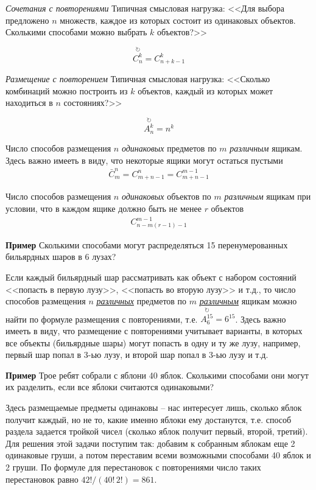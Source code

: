 \documentclass[%
	11pt,
	a4paper,
	utf8,
		]{article}
\begin{document}
\emph{Сочетания с повторениями} Типичная смысловая нагрузка: <<Для выбора предложено $ n $ множеств, каждое из которых состоит из одинаковых объектов. Сколькими способами можно выбрать $ k $ объектов?>>

$$ \stackrel{\circlearrowright}{C_n^k} = C_{n + k - 1}^k $$

\emph{Размещение с повторением} Типичная смысловая нагрузка: <<Сколько комбинаций можно построить из $ k $ объектов, каждый из которых может находиться в $ n $ состояниях?>>

$$ \stackrel{\circlearrowright}{A_n^k} = n^k $$

Число способов размещения $ n $ \emph{одинаковых} предметов по $ m $ \emph{различным} ящикам. Здесь важно имееть в виду, что некоторые ящики могут остаться пустыми
\begin{align*}
	\bar{C}_m^n = C_{m+n-1}^n = C_{m+n-1}^{m-1}
\end{align*}

Число способов размещения $ n $ \emph{одинаковых} объектов по $ m $ \emph{различным} ящикам при условии, что в каждом ящике должно быть не менее $ r $ объектов
\begin{align*}
	C^{m-1}_{n - m(r-1) -1}
\end{align*}

\textbf{Пример} \cite[]{vilenkin:comb-2022} Сколькими способами могут распределяться 15 перенумерованных бильярдных шаров в 6 лузах?

Если каждый бильярдный шар рассматривать как объект с набором состояний <<попасть в первую лузу>>, <<попасть во вторую лузу>> и т.д., то число способов размещения $ n $ \emph{\underline{различных}} предметов по $ m $ \emph{\underline{различным}} ящикам можно найти по формуле размещения с повторениями, т.е. $ \stackrel{\circlearrowright}{A_{6}^{15}} = 6^{15} $. Здесь важно имееть в виду, что размещение с повторениями учитывает варианты, в которых все объекты (бильярдные шары) могут попасть в одну и ту же лузу, например, первый шар попал в 3-ью лузу, и второй шар попал в 3-ью лузу и т.д.

\textbf{Пример} \cite[]{vilenkin:comb-2022} Трое ребят собрали с яблони 40 яблок. Сколькими способами они могут их разделить, если все яблоки считаются одинаковыми?

Здесь размещаемые предметы одинаковы -- нас интересует лишь, сколько яблок получит каждый, но не то, какие именно яблоки ему достанутся, т.е. способ раздела задается тройкой чисел (сколько яблок получит первый, второй, третий). Для решения этой задачи поступим так: добавим к собранным яблокам еще 2 одинаковые груши, а потом переставим всеми возможными способами 40 яблок и 2 груши. По формуле для перестановок с повторениями число таких перестановок равно $ 42! / (40! \, 2!) = 861 $.
\end{document}
